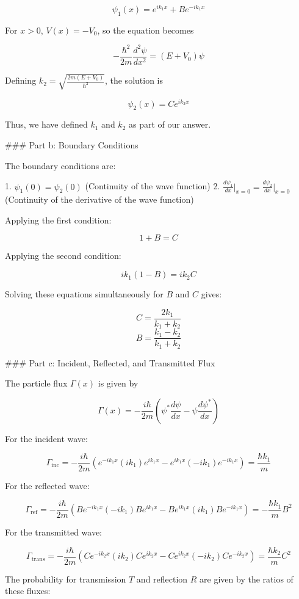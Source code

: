 \documentclass[a4paper,11pt]{article}
\begin{document}
\[
\psi_1(x) = e^{ik_1x} + Be^{-ik_1x}
\]

For \(x > 0\), \(V(x) = -V_0\), so the equation becomes

\[
-\frac{\hbar^2}{2m} \frac{d^2\psi}{dx^2} = (E + V_0)\psi
\]

Defining \(k_2 = \sqrt{\frac{2m(E+V_0)}{\hbar^2}}\), the solution is

\[
\psi_2(x) = Ce^{ik_2x}
\]

Thus, we have defined \(k_1\) and \(k_2\) as part of our answer.

### Part b: Boundary Conditions

The boundary conditions are:

1. \(\psi_1(0) = \psi_2(0)\) (Continuity of the wave function)
2. \(\frac{d\psi_1}{dx}\bigg|_{x=0} = \frac{d\psi_2}{dx}\bigg|_{x=0}\) (Continuity of the derivative of the wave function)

Applying the first condition:

\[
1 + B = C
\]

Applying the second condition:

\[
ik_1(1 - B) = ik_2C
\]

Solving these equations simultaneously for \(B\) and \(C\) gives:

\[
C = \frac{2k_1}{k_1+k_2}
\]
\[
B = \frac{k_1-k_2}{k_1+k_2}
\]

### Part c: Incident, Reflected, and Transmitted Flux

The particle flux \(\Gamma(x)\) is given by

\[
\Gamma(x) = -\frac{i\hbar}{2m} \left(\psi^{*}\frac{d\psi}{dx} - \psi\frac{d\psi^{*}}{dx} \right)
\]

For the incident wave:

\[
\Gamma_{\text{inc}} = -\frac{i\hbar}{2m} \left(e^{-ik_1x}(ik_1)e^{ik_1x} - e^{ik_1x}(-ik_1)e^{-ik_1x}\right) = \frac{\hbar k_1}{m}
\]

For the reflected wave:

\[
\Gamma_{\text{ref}} = -\frac{i\hbar}{2m} \left(Be^{-ik_1x}(-ik_1)Be^{ik_1x} - Be^{ik_1x}(ik_1)Be^{-ik_1x}\right) = -\frac{\hbar k_1}{m}B^2
\]

For the transmitted wave:

\[
\Gamma_{\text{trans}} = -\frac{i\hbar}{2m} \left(Ce^{-ik_2x}(ik_2)Ce^{ik_2x} - Ce^{ik_2x}(-ik_2)Ce^{-ik_2x}\right) = \frac{\hbar k_2}{m}C^2
\]

The probability for transmission \(T\) and reflection \(R\) are given by the ratios of these fluxes:
\end{document}
